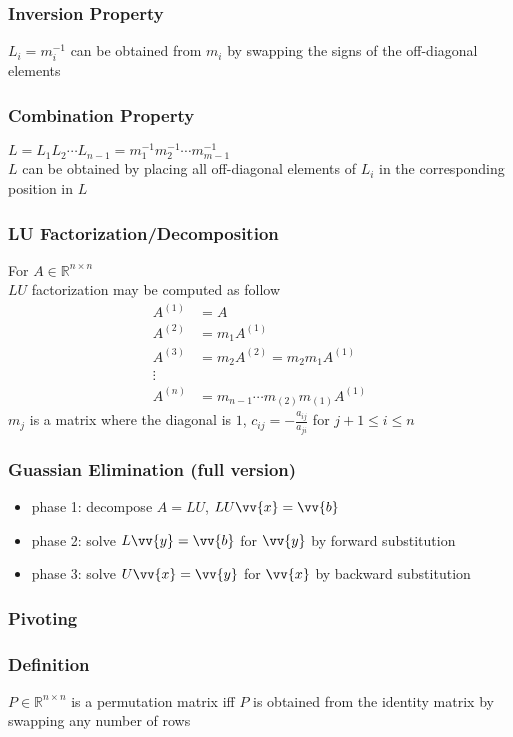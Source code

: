 \documentclass[11pt]{article}
\newcommand{\R}{{\mathbb{R}}}
\newcommand{\vb}{\vv{b}}
\newcommand{\vx}{\vv{x}}
\newcommand{\vy}{\vv{y}}
\newcommand{\ds}{\displaystyle}
\begin{document}
\subsubsection*{Inversion Property}
$L_i = m^{-1}_i$ can be obtained from $m_i$ by swapping the signs of the off-diagonal elements
\subsubsection*{Combination Property}
$L=L_1L_2\cdots L_{n-1} = m_1^{-1}m_2^{-1}\cdots m_{m-1}^{-1}$ \\
$L$ can be obtained by placing all off-diagonal elements of $L_i$ in the corresponding position in $L$
\subsubsection*{LU Factorization/Decomposition}
For $A\in\R^{n\times n}$ \\
$LU$ factorization may be computed as follow 
\begin{align*}
  A^{(1)} &= A \\
  A^{(2)} &= m_1A^{(1)} \\
  A^{(3)} &= m_2A^{(2)} = m_2m_1A^{(1)} \\
  \vdots \\
  A^{(n)} &= m_{n-1}\cdots m_{(2)}m_{(1)}A^{(1)}
\end{align*}
$m_j$ is a matrix where the diagonal is $1$, $c_{ij}=-\ds\frac{a_{ij}}{a_{ji}}$ for $j+1\leq i\leq n$
\subsubsection{Guassian Elimination (full version)}
\begin{itemize}
  \item phase 1: decompose $A=LU$, $LU\vx = \vb$
  \item phase 2: solve $L\vy=\vb$ for $\vy$ by forward substitution
  \item phase 3: solve $U\vx=\vy$ for $\vx$ by backward substitution 
\end{itemize}
\subsubsection{Pivoting}
\subsubsection*{Definition}
$P\in\R^{n\times n}$ is a permutation matrix iff $P$ is obtained from the identity matrix by swapping any number of rows
\end{document}
